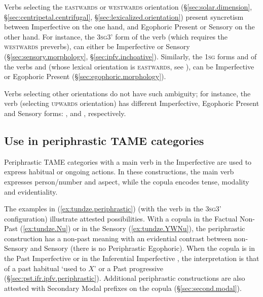 Verbs selecting the \textsc{eastwards} or \textsc{westwards} orientation (§\ref{sec:solar.dimension}, §\ref{sec:centripetal.centrifugal}, §\ref{sec:lexicalized.orientation}) present syncretism between Imperfective on the one hand, and Egophoric Present or Sensory on the other hand. For instance, the \textsc{3sg}\fl{}3' form  of the verb  (which requires the \textsc{westwards} preverbs), can either be Imperfective or Sensory (§\ref{sec:sensory.morphology}, §\ref{sec:ipfv.inchoative}). Similarly, the \textsc{1sg} forms  and  of the verbs  and  (whose lexical orientation is \textsc{eastwards}, see ), can be Imperfective or Egophoric Present (§\ref{sec:egophoric.morphology}).
 
 Verbs selecting other orientations do not have such ambiguity; for instance, the verb  (selecting \textsc{upwards} orientation) has different Imperfective, Egophoric Present and Sensory forms: ,  and , respectively.

\subsection{Use in periphrastic TAME categories} \label{sec:ipfv.periphrastic.TAME}
Periphrastic TAME categories with a main verb in the Imperfective are used to express habitual or ongoing actions. In these constructions, the main verb expresses person/number and aspect, while the copula encodes tense, modality and evidentiality.

The examples in (\ref{ex:tundze.periphrastic}) (with the verb  in the \textsc{3sg}\fl{}3' configuration) illustrate attested possibilities. With a copula in the Factual Non-Past  (\ref{ex:tundze.Nu}) or in the Sensory  (\ref{ex:tundze.YWNu}), the periphrastic construction has a non-past meaning with an evidential contrast between non-Sensory and Sensory (there is no Periphrastic Egophoric). When the copula is in the Past Imperfective  or in the Inferential Imperfective , the interpretation is that of a past habitual `used to $X$' or a Past progressive (§\ref{sec:pst.ifr.ipfv.periphrastic}). Additional periphrastic constructions are also attested with Secondary Modal prefixes on the copula (§\ref{sec:second.modal}).

